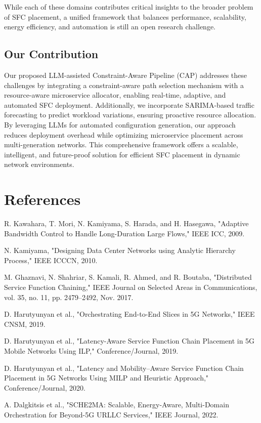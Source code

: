 \documentclass[conference]{IEEEtran}
\begin{document}
	While each of these domains contributes critical insights to the broader problem of SFC placement, a unified framework that balances performance, scalability, energy efficiency, and automation is still an open research challenge.
	
	\subsection{Our Contribution}
	
	Our proposed LLM-assisted Constraint-Aware Pipeline (CAP) addresses these challenges by integrating a constraint-aware path selection mechanism with a resource-aware microservice allocator, enabling real-time, adaptive, and automated SFC deployment. Additionally, we incorporate SARIMA-based traffic forecasting to predict workload variations, ensuring proactive resource allocation. By leveraging LLMs for automated configuration generation, our approach reduces deployment overhead while optimizing microservice placement across multi-generation networks. This comprehensive framework offers a scalable, intelligent, and future-proof solution for efficient SFC placement in dynamic network environments.
	
	\section{References}
	
	\begin{thebibliography}{99}
		
		R. Kawahara, T. Mori, N. Kamiyama, S. Harada, and H. Hasegawa,  
		"Adaptive Bandwidth Control to Handle Long-Duration Large Flows,"  
		IEEE ICC, 2009.
		
		N. Kamiyama,  
		"Designing Data Center Networks using Analytic Hierarchy Process,"  
		IEEE ICCCN, 2010.
		
		M. Ghaznavi, N. Shahriar, S. Kamali, R. Ahmed, and R. Boutaba,  
		"Distributed Service Function Chaining,"  
		IEEE Journal on Selected Areas in Communications, vol. 35, no. 11, pp. 2479–2492, Nov. 2017.
		
		D. Harutyunyan et al.,  
		"Orchestrating End-to-End Slices in 5G Networks,"  
		IEEE CNSM, 2019.
		
		D. Harutyunyan et al.,  
		"Latency-Aware Service Function Chain Placement in 5G Mobile Networks Using ILP,"  
		Conference/Journal, 2019.
		
		D. Harutyunyan et al.,  
		"Latency and Mobility–Aware Service Function Chain Placement in 5G Networks Using MILP and Heuristic Approach,"  
		Conference/Journal, 2020.
		
		A. Dalgkitsis et al.,  
		"SCHE2MA: Scalable, Energy-Aware, Multi-Domain Orchestration for Beyond-5G URLLC Services,"  
		IEEE Journal, 2022.
		
	\end{thebibliography}
	
\end{document}
